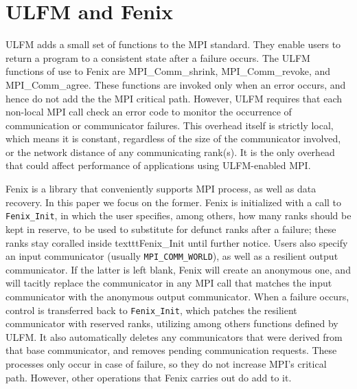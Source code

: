 \section{ULFM and Fenix}\label{sec:implem}
ULFM adds a small set of functions to the MPI standard.
They enable users to return a program to a consistent state after a failure occurs.
The ULFM functions of use to Fenix are MPI\_Comm\_shrink, MPI\_Comm\_revoke, and MPI\_Comm\_agree.
These functions are invoked only when an error occurs, and hence do
not add the the MPI critical path.
However, ULFM requires that each non-local MPI call check an error code to
monitor the occurrence of communication or communicator failures.
This overhead itself is strictly local, which means it is constant, regardless of the
size of the communicator involved, or the network distance of any communicating rank(s).
It is the only overhead that could affect performance of applications using
ULFM-enabled MPI.

Fenix is a library \cite{fenixspec} that conveniently supports MPI process,
as well as data recovery. In this paper we focus on the former.
Fenix is initialized with a call to \texttt{Fenix\_Init}, in which the user specifies,
among others, how many ranks should be kept in reserve, to be used to substitute for
defunct ranks after a failure; these ranks stay coralled inside texttt{Fenix\_Init}
until further notice.
Users also specify an input communicator (usually \texttt{MPI\_COMM\_WORLD}), as well
as a resilient output communicator.
If the latter is left blank, Fenix will create an anonymous one, and will tacitly
replace the communicator in any MPI call that matches the input communicator with
the anonymous output communicator.
When a failure occurs, control is transferred back to \texttt{Fenix\_Init}, which patches
the resilient communicator with reserved ranks, utilizing among others functions
defined by ULFM.
It also automatically deletes any communicators that were derived from that base
communicator, and removes pending communication requests.
These processes only occur in case of failure, so they do not increase MPI's critical
path. However, other operations that Fenix carries out do add to it.

